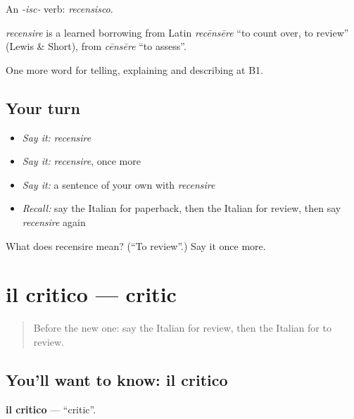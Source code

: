 An \emph{-isc-} verb: \emph{recensisco}.

\begin{cousinweb}
\emph{recensire} is a learned borrowing from Latin \emph{recēnsēre} \textquotedblleft{}to count over, to review\textquotedblright{} (Lewis \& Short), from \emph{cēnsēre} \textquotedblleft{}to assess\textquotedblright{}.
\end{cousinweb}

\begin{grammarlens}[title={What you've built}]
One more word for telling, explaining and describing at B1.
\end{grammarlens}

\subsection*{Your turn}
\begin{itemize}
\raggedright
  \item \emph{Say it:} \emph{recensire}
  \item \emph{Say it:} \emph{recensire}, once more
  \item \emph{Say it:} a sentence of your own with \emph{recensire}
  \item \emph{Recall:} say the Italian for paperback, then the Italian for review, then say \emph{recensire} again
\end{itemize}

\begin{tcolorbox}[breakable,colback=teal!4,colframe=teal!35!black,title={Before you move on}]
What does recensire mean? (\textquotedblleft{}To review\textquotedblright{}.) Say it once more.
\end{tcolorbox}
\section[il critico]{il critico — critic}

\label{lesson:IT-C526-critico}



\begin{quote}
Before the new one: say the Italian for review, then the Italian for to review.
\end{quote}

\subsection*{You'll want to know: il critico}
\textbf{il critico} — \textquotedblleft{}critic\textquotedblright{}.

